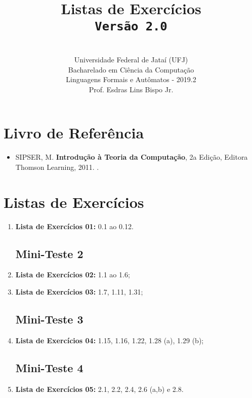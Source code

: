\documentclass[12pt,a4paper,oneside]{article}
\author{\\Universidade Federal de Jataí (UFJ)\\Bacharelado em Ciência da Computação \\Linguagens Formais e Autômatos - 2019.2 \\Prof. Esdras Lins Bispo Jr.}
\date{}
\title{
	\sc \huge Listas de Exercícios
	\\{\tt Versão 2.0}
}
\begin{document}
\maketitle

\section{Livro de Referência}
	\begin{itemize}
		\item SIPSER, M. {\bf Introdução à Teoria da Computação}, 2a Edição, Editora Thomson Learning, 2011. \color{blue}{\bf Código Bib.: [004 SIP/int]}.
	\end{itemize}
	
\section{Listas de Exercícios}

\begin{enumerate}

	\subsection{Mini-Teste 1}
	\item[] {\bf Lista de Exercícios 01:} 0.1 ao 0.12.
	
	\subsection{Mini-Teste 2}
	\item[] {\bf Lista de Exercícios 02:} 1.1 ao 1.6;
	\item[] {\bf Lista de Exercícios 03:} 1.7, 1.11, 1.31;
	
	\subsection{Mini-Teste 3}
	\item[] {\bf Lista de Exercícios 04:} 1.15, 1.16, 1.22, 1.28 (a), 1.29 (b);
	
	\subsection{Mini-Teste 4}
	\item[] {\bf Lista de Exercícios 05:} 2.1, 2.2, 2.4, 2.6 (a,b) e 2.8.
	
\end{enumerate}
\end{document}
